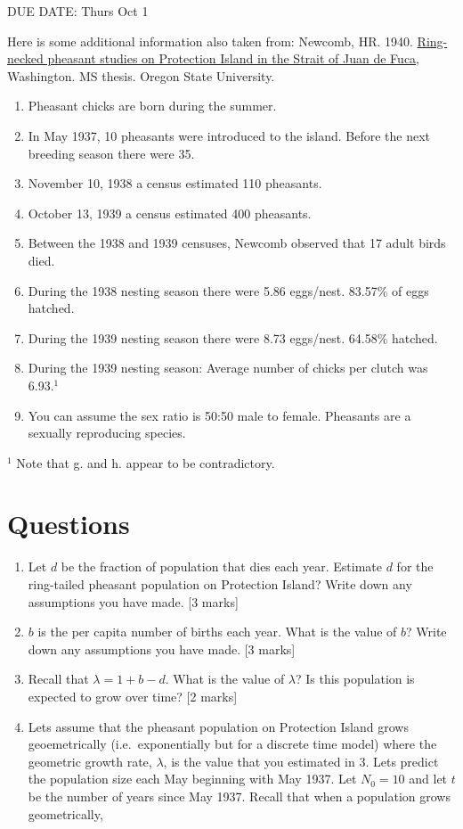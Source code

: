 \documentclass[]{book}
\providecommand{\tightlist}{%
  \setlength{\itemsep}{0pt}\setlength{\parskip}{0pt}}
\begin{document}
DUE DATE: Thurs Oct 1

Here is some additional information also taken from: Newcomb, HR. 1940.
\href{https://ir.library.oregonstate.edu/concern/graduate_thesis_or_dissertations/js956j801?locale=en}{Ring-necked
pheasant studies on Protection Island in the Strait of Juan de Fuca},
Washington. MS thesis. Oregon State University.

\begin{enumerate}
\def\labelenumi{\alph{enumi}.}
\tightlist
\item
  Pheasant chicks are born during the summer.
\item
  In May 1937, 10 pheasants were introduced to the island. Before the
  next breeding season there were 35.
\item
  November 10, 1938 a census estimated 110 pheasants.
\item
  October 13, 1939 a census estimated 400 pheasants.
\item
  Between the 1938 and 1939 censuses, Newcomb observed that 17 adult
  birds died.
\item
  During the 1938 nesting season there were 5.86 eggs/nest. 83.57\% of
  eggs hatched.
\item
  During the 1939 nesting season there were 8.73 eggs/nest. 64.58\%
  hatched.
\item
  During the 1939 nesting season: Average number of chicks per clutch
  was 6.93.\(^1\)
\item
  You can assume the sex ratio is 50:50 male to female. Pheasants are a
  sexually reproducing species.
\end{enumerate}

\(^1\) Note that g. and h. appear to be contradictory.

\section{Questions}\label{questions}

\begin{enumerate}
\def\labelenumi{\arabic{enumi}.}
\item
  Let \(d\) be the fraction of population that dies each year. Estimate
  \(d\) for the ring-tailed pheasant population on Protection Island?
  Write down any assumptions you have made. {[}3 marks{]}
\item
  \(b\) is the per capita number of births each year. What is the value
  of \(b\)? Write down any assumptions you have made. {[}3 marks{]}
\item
  Recall that \(\lambda = 1 + b-d\). What is the value of \(\lambda\)?
  Is this population is expected to grow over time? {[}2 marks{]}
\item
  Lets assume that the pheasant population on Protection Island grows
  geoemetrically (i.e.~exponentially but for a discrete time model)
  where the geometric growth rate, \(\lambda\), is the value that you
  estimated in 3. Lets predict the population size each May beginning
  with May 1937. Let \(N_0 = 10\) and let \(t\) be the number of years
  since May 1937. Recall that when a population grows geometrically,
\end{enumerate}
\end{document}
